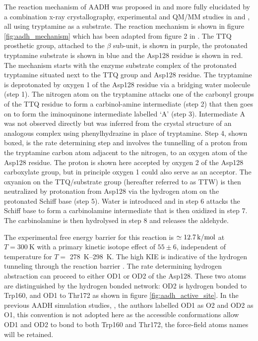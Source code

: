 The reaction mechanism of AADH was proposed in \cite{hyunMechanisticStudiesAromatic1995a} and more fully elucidated by a combination x-ray crystallography, experimental and QM/MM studies in \cite{masgrauAtomicDescriptionEnzyme2006}\cite{masgrauTunnelingClassicalPaths2007} and \cite{ranaghanInitioQMMM2017}, all using tryptamine as a substrate. 
The reaction mechanism is shown in figure \ref{fig:aadh_mechanism} which has been adapted from figure 2 in \cite{masgrauAtomicDescriptionEnzyme2006}. The TTQ prosthetic group, attached to the $\beta$ sub-unit, is shown in purple, the protonated tryptamine substrate is shown in blue and the Asp128 residue is shown in red.  The mechanism starts with the enzyme substrate complex of the protonated tryptamine situated next to the TTQ group and Asp128 residue.  The tryptamine is deprotonated by oxygen 1 of the Asp128 residue via a bridging water molecule (step 1).  The nitrogen atom on the tryptamine attacks one of the carbonyl groups of the TTQ residue to form a carbinol-amine intermediate (step 2) that then goes on to form the iminoquinone intermediate labelled `A' (step 3).  Intermediate A was not observed directly but was inferred from the crystal structure of an analogous complex using phenylhydrazine in place of tryptamine.  Step 4, shown boxed, is the rate determining step and involves the tunnelling of a proton from the tryptamine carbon atom adjacent to the nitrogen, to an oxygen atom of the Asp128 residue.  The proton is shown here accepted by oxygen 2 of the Asp128 carboxylate group, but in principle oxygen 1 could also serve as an acceptor. The oxyanion on the TTQ/substrate group (hereafter referred to as TTW) is then neutralized by protonation from Asp128 via the hydrogen atom on the protonated Schiff base (step 5). Water is introduced and in step 6 attacks the Schiff base to form a carbinolamine intermediate that is then oxidized in step 7.  The carbinolamine is then hydrolysed in step 8 and releases the aldehyde.  


The experimental free energy barrier for this reaction is $\simeq \SI{12.7}{\kilo\cal\per\mol}$ at $T=\SI{300}{\kelvin}$ with a primary kinetic isotope effect of $55 \pm 6$, independent of temperature for $T =$ \SIrange{278}{298}{\kelvin}\cite{masgrauAtomicDescriptionEnzyme2006}. The high KIE is indicative of the hydrogen tunneling through the reaction barrier  \cite{masgrauAtomicDescriptionEnzyme2006}\cite{kohenEnzymeCatalysisClassical1998}\cite{antoniouInternalEnzymeMotions2001}\cite{antoniouLargeKineticIsotope1997}\cite{allemannQuantumTunnellingEnzymecatalysed2009}. The rate determining hydrogen abstraction can proceed to either OD1 or OD2 of the Asp128. These two atoms are distinguished by the hydrogen bonded network: OD2 is hydrogen bonded to Trp160, and OD1 to Thr172 as shown in figure \ref{fig:aadh_active_site}. In the previous AADH simulation studies,  \cite{masgrauAtomicDescriptionEnzyme2006}\cite{masgrauTunnelingClassicalPaths2007}\cite{ranaghanInitioQMMM2017}, the authors labelled OD1 as O2 and OD2 as O1, this convention is not adopted here as the accessible conformations allow OD1 and OD2 to bond to both Trp160 and Thr172, the force-field atoms names will be retained. 

